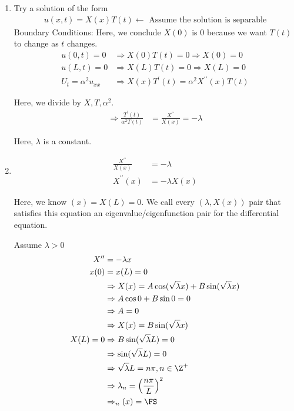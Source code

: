 \begin{enumerate}
  \item Try a solution of the form
  \begin{align}
    u(x, t) = X(x)T(t) \leftarrow \text{ Assume the solution is separable}
  \end{align}
  Boundary Conditions:
  Here, we conclude $X(0)$ is $0$ because
  we want $T(t)$ to change as $t$ changes.
  \begin{align}
    u(0, t) = 0 & \Rightarrow X(0)T(t) = 0 \Rightarrow X(0) = 0\\
    u(L, t) = 0 & \Rightarrow X(L)T(t) = 0 \Rightarrow X(L) = 0\\
    U_t = \alpha^2 u_{xx} & \Rightarrow X(x)T^\prime(t) = \alpha^2 X^{\prime\prime}(x) T(t)
  \end{align}

  Here, we divide by $X, T, \alpha^2$.
  \begin{align}
    \Rightarrow \frac{T^\prime(t)}{\alpha^2T(t)} & = \frac{X^{\prime\prime}}{X(x)} = -\lambda
  \end{align}

  Here, $\lambda$ is a constant.
  \item
  \begin{align}
    \frac{X^{\prime\prime}}{X(x)} & = -\lambda\\
    X^{\prime\prime}(x) & = -\lambda X(x)
  \end{align}

  Here, we know $(x) = X(L) = 0$.
  We call every $(\lambda, X(x))$ pair that satisfies this equation
  an eigenvalue/eigenfunction pair for the differential equation.

  Assume $\lambda > 0$
  \begin{align}
    X^{\prime\prime} & = -\lambda x\\
    x(0) & = x(L) = 0\\
    & \Rightarrow X(x) = A \cos(\sqrt{\lambda} x) + B\sin(\sqrt{\lambda} x)\\
    & \Rightarrow A \cos 0 + B \sin 0 = 0\\
    & \Rightarrow A = 0\\
    & \Rightarrow X(x) = B \sin(\sqrt \lambda x)\\
    X(L) = 0 & \Rightarrow B \sin(\sqrt \lambda L) = 0\\
    & \Rightarrow \sin(\sqrt \lambda L) = 0\\
    & \Rightarrow \sqrt \lambda L = n \pi, n \in \Z^+\\
    & \Rightarrow \lambda_n = \Big( \frac{n \pi}{L} \Big)^2\\
    & \Rightarrow_n(x) = \FS
  \end{align}
\end{enumerate}

